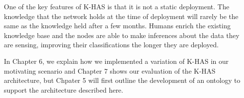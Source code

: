 		One of the key features of K-HAS is that it is not a static deployment. The knowledge that the network holds at the time of deployment will rarely be the same as the knowledge held after a few months. Humans enrich the existing knowledge base and the nodes are able to make inferences about the data they are sensing, improving their classifications the longer they are deployed.
		
		In Chapter 6, we explain how we implemented a variation of K-HAS in our motivating scenario and Chapter 7 shows our evaluation of the K-HAS architecture, but Chpater 5 will first outline the development of an ontology to support the architecture described here.
		
			
			
			
			
			
			
			
			